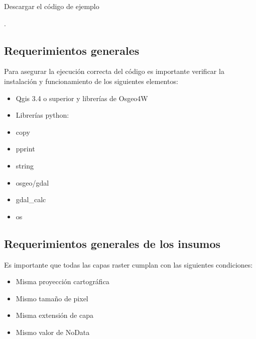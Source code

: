 \documentclass[letterpaper,10pt,spanish]{sphinxmanual}
\begin{document}
Descargar el código de ejemplo

.


\subsection{Requerimientos generales}
\label{\detokenize{analisis:requerimientos-generales}}
Para asegurar la ejecución correcta del código es importante
verificar la instalación y funcionamiento de los siguientes elementos:
\begin{itemize}
\item {} 
Qgis 3.4 o superior y librerías de Osgeo4W

\item {} 
Librerías python:

\end{itemize}
\begin{itemize}
\item {} 
copy

\item {} 
pprint

\item {} 
string

\item {} 
osgeo/gdal

\item {} 
gdal\_calc

\item {} 
os

\end{itemize}


\subsection{Requerimientos generales de los insumos}
\label{\detokenize{analisis:requerimientos-generales-de-los-insumos}}
Es importante que todas las capas raster cumplan con las siguientes condiciones:
\begin{itemize}
\item {} 
Misma proyección cartográfica

\item {} 
Mismo tamaño de pixel

\item {} 
Misma extensión de capa

\item {} 
Mismo valor de NoData

\end{itemize}
\end{document}
